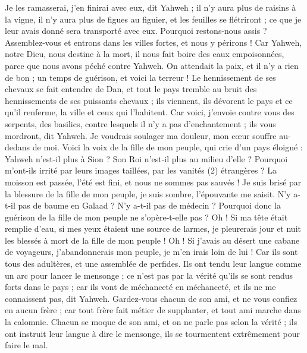 \begin{multicols}{2}
Je les ramasserai, j’en finirai avec eux, dit Yahweh ; il n'y aura plus de raisins à la vigne, il n'y aura plus de figues au figuier, et les feuilles se flétriront ; ce que je leur avais donné sera transporté avec eux.
Pourquoi restons-nous assis ? Assemblez-vous et entrons dans les villes fortes, et nous y périrons ! Car Yahweh, notre Dieu, nous destine à la mort, il nous fait boire des eaux empoisonnées, parce que nous avons péché contre Yahweh.
On attendait la paix, et il n'y a rien de bon ; un temps de guérison, et voici la terreur !
Le hennissement de ses chevaux se fait entendre de Dan, et tout le pays tremble au bruit des hennissements de ses puissants chevaux ; ils viennent, ils dévorent le pays et ce qu’il renferme, la ville et ceux qui l’habitent.
Car voici, j’envoie contre vous des serpents, des basilics, contre lesquels il n'y a pas d'enchantement ; ils vous mordront, dit Yahweh.
Je voudrais soulager ma douleur, mon cœur souffre au-dedans de moi.
Voici la voix de la fille de mon peuple, qui crie d'un pays éloigné : Yahweh n'est-il plus à Sion ? Son Roi n'est-il plus au milieu d'elle ? Pourquoi m'ont-ils irrité par leurs images taillées, par les vanités (2) étrangères ?
La moisson est passée, l'été est fini, et nous ne sommes pas sauvés !
Je suis brisé par la blessure de la fille de mon peuple, je suis sombre, l’épouvante me saisit.
N'y a-t-il pas de baume en Galaad ? N’y a-t-il pas de médecin ? Pourquoi donc la guérison de la fille de mon peuple ne s'opère-t-elle pas ?
\VerseOne{}Oh ! Si ma tête était remplie d'eau, si mes yeux étaient une source de larmes, je pleurerais jour et nuit les blessés à mort de la fille de mon peuple !
Oh ! Si j’avais au désert une cabane de voyageurs, j'abandonnerais mon peuple, je m’en irais loin de lui ! Car ils sont tous des adultères, et une assemblée de perfides.
Ils ont tendu leur langue comme un arc pour lancer le mensonge ; ce n’est pas par la vérité qu’ils se sont rendus forts dans le pays ; car ils vont de méchanceté en méchanceté, et ils ne me connaissent pas, dit Yahweh.
Gardez-vous chacun de son ami, et ne vous confiez en aucun frère ; car tout frère fait métier de supplanter, et tout ami marche dans la calomnie.
Chacun se moque de son ami, et on ne parle pas selon la vérité ; ils ont instruit leur langue à dire le mensonge, ils se tourmentent extrêmement pour faire le mal.

\end{multicols}
